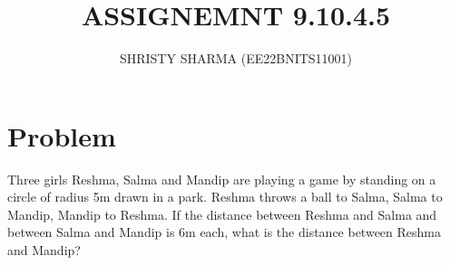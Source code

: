 \documentclass[A4,11pt,twocolumn]{IEEEtran}
\begin{document}
\makeatletter
{}
\makeatother
\let\StandardTheFigure\thefigure
\let\vec\mathbf
\renewcommand{\thefigure}{\theproblem}
\def\putbox#1#2#3{\makebox[0in][l]{\makebox[#1][l]{}\raisebox{\baselineskip}[0in][0in]{\raisebox{#2}[0in][0in]{#3}}}}
     \def\rightbox#1{\makebox[0in][r]{#1}}
     \def\centbox#1{\makebox[0in]{#1}}
     \def\topbox#1{\raisebox{-\baselineskip}[0in][0in]{#1}}
     \def\midbox#1{\raisebox{-0.5\baselineskip}[0in][0in]{#1}}
\vspace{3cm}
\title{ASSIGNEMNT 9.10.4.5}
\author{SHRISTY SHARMA (EE22BNITS11001)}
\maketitle
\newpage
\bigskip
\renewcommand{\thefigure}{\theenumi}
\renewcommand{\thetable}{\theenumi}
\section{Problem}
Three girls Reshma, Salma and Mandip are playing a game by standing on a circle of radius 5m drawn in a park. Reshma throws a ball to Salma, Salma to Mandip, Mandip to Reshma. If the distance between Reshma and Salma and
between Salma and Mandip is 6m each, what is the distance between Reshma and Mandip?
\end{document}
